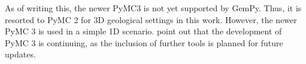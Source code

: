 		As of writing this, the newer PyMC3 is not yet supported by GemPy. Thus, it is resorted to PyMC 2 for 3D geological settings in this work. However, the newer PyMC 3 is used in a simple 1D scenario. \citet{salvatier2016pymc3} point out that the development of PyMC 3 is continuing, as the inclusion of further tools is planned for future updates.
		

		
		
